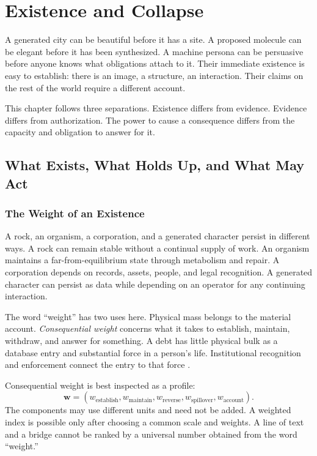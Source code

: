 \chapter{Existence and Collapse}

A generated city can be beautiful before it has a site. A proposed molecule can be elegant before it has been synthesized. A machine persona can be persuasive before anyone knows what obligations attach to it. Their immediate existence is easy to establish: there is an image, a structure, an interaction. Their claims on the rest of the world require a different account.

This chapter follows three separations. Existence differs from evidence. Evidence differs from authorization. The power to cause a consequence differs from the capacity and obligation to answer for it.

\section{What Exists, What Holds Up, and What May Act}

\subsection{The Weight of an Existence}

A rock, an organism, a corporation, and a generated character persist in different ways. A rock can remain stable without a continual supply of work. An organism maintains a far-from-equilibrium state through metabolism and repair. A corporation depends on records, assets, people, and legal recognition. A generated character can persist as data while depending on an operator for any continuing interaction.

The word “weight” has two uses here. Physical mass belongs to the material account. \emph{Consequential weight} concerns what it takes to establish, maintain, withdraw, and answer for something. A debt has little physical bulk as a database entry and substantial force in a person's life. Institutional recognition and enforcement connect the entry to that force \cite{searle1995construction}.

Consequential weight is best inspected as a profile:
\begin{equation}
 \mathbf w=
 (w_{\mathrm{establish}},w_{\mathrm{maintain}},
  w_{\mathrm{reverse}},w_{\mathrm{spillover}},
  w_{\mathrm{account}}).
\end{equation}
The components may use different units and need not be added. A weighted index is possible only after choosing a common scale and weights. A line of text and a bridge cannot be ranked by a universal number obtained from the word “weight.”

